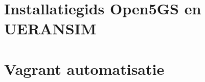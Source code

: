 \documentclass[dutch,dit,thesis]{hogentreport}
\begin{document}
\chapter{Installatiegids Open5GS en UERANSIM}
\label{ch:InstallationGuide}


\chapter{Vagrant automatisatie}
\label{ch:vagrant}




\backmatter{}

\setlength\bibitemsep{2pt} %
\printbibliography[heading=bibintoc]
\end{document}
